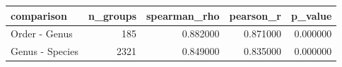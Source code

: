 \begin{tabular}{lrrrr}
\toprule
comparison & n_groups & spearman_rho & pearson_r & p_value \\
\midrule
Order - Genus & 185 & 0.882000 & 0.871000 & 0.000000 \\
Genus - Species & 2321 & 0.849000 & 0.835000 & 0.000000 \\
\bottomrule
\end{tabular}
